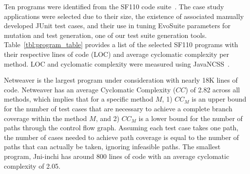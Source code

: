 Ten programs were identified from the SF110 code suite~\cite{fraser:2012}.  The case study applications were selected due to their size, the existence of associated manually developed JUnit test cases, and their use in tuning EvoSuite parameters for mutation and test generation, one of our test suite generation tools.  Table~\ref{tbl:program_table} provides a list of the selected SF110 programs with their respective lines of code (LOC) and average cyclomatic complexity per method.  LOC and cyclomatic complexity were measured using JavaNCSS~\cite{leejavancss}.  

Netweaver is the largest program under consideration with nearly 18K lines of code.  Netweaver has an average Cyclomatic Complexity ($CC$) of 2.82 across all methods, which implies that for a specific method $M$, 1) $CC_M$ is an upper bound for the number of test cases that are necessary to achieve a complete branch coverage within the method $M$, and 2) $CC_M$ is a lower bound for the number of paths through the control flow graph. Assuming each test case takes one path, the number of cases needed to achieve path coverage is equal to the number of paths that can actually be taken, ignoring infeasible paths.  The smallest program, Jni-inchi has around 800 lines of code with an average cyclomatic complexity of 2.05.  

